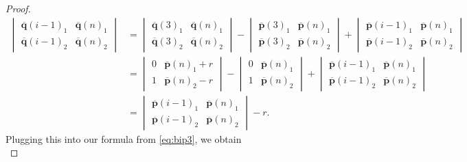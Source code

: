 \documentclass[10pt,a4paper]{amsart}
\begin{document}
\begin{proof}
\begin{equation}
    \begin{split}
        \begin{vmatrix}
            \overline{\mathbf{q}}(i-1)_1 & \overline{\mathbf{q}}(n)_1 \\ \overline{\mathbf{q}}(i-1)_2 & \overline{\mathbf{q}}(n)_2
        \end{vmatrix} &= \begin{vmatrix} \overline{\mathbf{q}}(3)_1 & \overline{\mathbf{q}}(n)_1 \\ \overline{\mathbf{q}}(3)_2 & \overline{\mathbf{q}}(n)_2 \end{vmatrix} - \begin{vmatrix} \overline{\mathbf{p}}(3)_1 & \overline{\mathbf{p}}(n)_1 \\ \overline{\mathbf{p}}(3)_2 & \overline{\mathbf{p}}(n)_2 \end{vmatrix} + \begin{vmatrix} \overline{\mathbf{p}}(i-1)_1 & \overline{\mathbf{p}}(n)_1 \\ \overline{\mathbf{p}}(i-1)_2 & \overline{\mathbf{p}}(n)_2 \end{vmatrix} \\
        &= \begin{vmatrix} 0 & \overline{\mathbf{p}}(n)_1 + r \\ 1 & \overline{\mathbf{p}}(n)_2 - r \end{vmatrix} - \begin{vmatrix} 0 & \overline{\mathbf{p}}(n)_1 \\ 1 & \overline{\mathbf{p}}(n)_2 \end{vmatrix} + \begin{vmatrix} \overline{\mathbf{p}}(i-1)_1 & \overline{\mathbf{p}}(n)_1 \\ \overline{\mathbf{p}}(i-1)_2 & \overline{\mathbf{p}}(n)_2 \end{vmatrix} \\
        &= \begin{vmatrix}
            \overline{\mathbf{p}}(i-1)_1 & \overline{\mathbf{p}}(n)_1 \\ \overline{\mathbf{p}}(i-1)_2 & \overline{\mathbf{p}}(n)_2
        \end{vmatrix} - r.
    \end{split} 
    \end{equation}
    Plugging this into our formula from \cref{eq:bip3}, we obtain
    \begin{equation}\label{eq:bip5}

\end{equation}
\end{proof}
\end{document}
